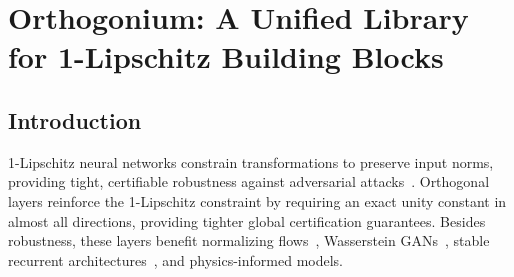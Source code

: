 \chapter{Orthogonium: A Unified Library for 1-Lipschitz Building Blocks}
\label{ch:orthogonium}

\section{Introduction}
\label{sec:intro}

    1-Lipschitz neural networks constrain transformations to preserve input norms, providing tight, certifiable robustness against adversarial attacks~\cite{szegedy_intriguing_2013, anil_sorting_2019}. Orthogonal layers reinforce the 1-Lipschitz constraint by requiring an exact unity constant in almost all directions, providing tighter global certification guarantees. Besides robustness, these layers benefit normalizing flows~\cite{kingma2018glow,behrmann2019invertible}, Wasserstein GANs~\cite{arjovsky2017wasserstein,gulrajani2017improved}, stable recurrent architectures~\cite{kiani_projunn_2022,qi_deep_isometric_2020,bansal2018gainorthogonalityregularizationstraining}, and physics-informed models. 
